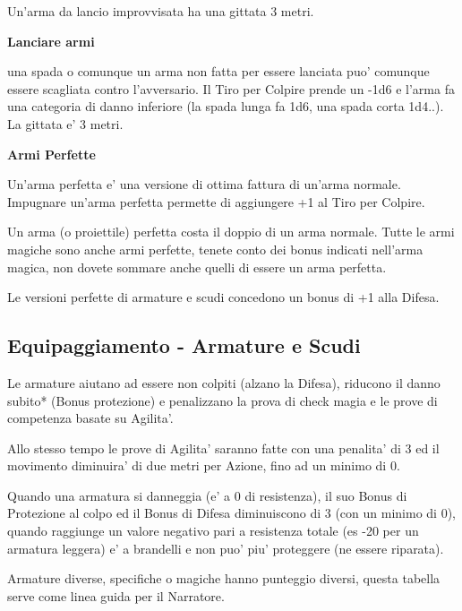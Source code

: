 \documentclass[a4paper,11pt,twoside,openany]{book}
\begin{document}
{		Un'arma da lancio improvvisata ha una gittata 3 metri.
		
		\medskip
		
		\textbf{Lanciare armi}
		
		una spada o comunque un arma non fatta per essere lanciata puo' comunque essere scagliata contro l'avversario. Il Tiro per Colpire prende un -1d6 e l'arma fa una categoria di danno inferiore (la spada lunga fa 1d6, una spada corta 1d4..). La gittata e' 3 metri.
		
		\medskip
		
		\textbf{Armi Perfette}
		
		Un'arma perfetta e' una versione di ottima fattura di un'arma normale.
		Impugnare un'arma perfetta permette di aggiungere +1 al Tiro per Colpire.
		
		Un arma (o proiettile) perfetta costa il doppio di un arma normale. 
		Tutte le armi magiche sono anche armi perfette, tenete conto dei bonus 	indicati nell'arma magica, non dovete sommare anche quelli di essere un arma perfetta.
		
		Le versioni perfette di armature e scudi concedono un bonus di +1 alla Difesa.
		
		
		
		\pagebreak
		
		\subsection{Equipaggiamento - Armature e Scudi}
		
		\label{equipaggiamento---armature-e-scudi}
		
		Le armature aiutano ad essere non colpiti (alzano la Difesa), riducono il danno subito{*} (Bonus protezione) e penalizzano la prova di check magia e le prove di competenza basate su Agilita'.
		
		Allo stesso tempo le prove di Agilita' saranno fatte con una penalita' di 3 ed il movimento diminuira' di due metri per Azione, fino ad un minimo di 0.
		
		Quando una armatura si danneggia (e' a 0 di resistenza), il suo Bonus di Protezione al colpo ed il Bonus di Difesa diminuiscono di 3 (con un minimo di 0), quando raggiunge un valore negativo pari a resistenza totale (es -20 per un armatura leggera) e' a brandelli e non puo' piu' proteggere (ne essere riparata).
		
		Armature diverse, specifiche o magiche hanno punteggio diversi, questa tabella serve come linea guida per il Narratore.
		
}
\end{document}
